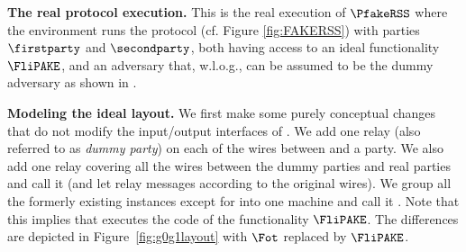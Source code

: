 

\begin{games}
\textbf{The real protocol execution.}
This is the real execution of $\PfakeRSS$ where the environment \Env runs the protocol (cf. Figure \ref{fig:FAKERSS}) with parties $\firstparty$ and $\secondparty$, both having access to an ideal \liPAKE functionality $\FliPAKE$, and an adversary \AdvA that, w.l.o.g., can be assumed to be the dummy adversary as shown in \cite[section 4.4.1]{FOCS:Canetti01}.

\textbf{Modeling the ideal layout.}
We first make some purely conceptual changes that do not modify the input/output interfaces of \Env. We add one relay (also referred to as \emph{dummy party}) on each of the wires between \Env and a party. We also add one relay covering all the wires between the dummy parties and real parties and call it \Func (and let \Func relay messages according to the original wires). We group all the formerly existing instances except for \Env into one machine and call it \Sim. Note that this implies that \Sim executes the code of the \liPAKE functionality $\FliPAKE$. The differences are depicted in Figure~\ref{fig:g0g1layout} with $\Fot$ replaced by $\FliPAKE$.


\end{games}
